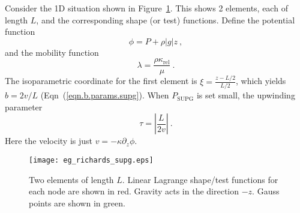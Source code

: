 \documentclass[]{scrreprt}
\begin{document}
Consider the 1D situation shown in Figure~\ref{eg_richards_supg.fig}.
This shows 2 elements, each of length $L$, and the corresponding shape
(or test) functions.  Define the potential function
\begin{equation}
\phi = P + \rho|g|z \ ,
\end{equation}
and the mobility function
\begin{equation}
\lambda = \frac{\rho \kappa_{\mathrm{rel}}}{\mu} \ .
\end{equation}
The isoparametric coordinate for the first element is $\xi =
\frac{z-L/2}{L/2}$, which yields $b=2v/L$
(Eqn~(\ref{eqn.b.params.supg}).  When $P_{\mathrm{SUPG}}$ is set
small, the upwinding parameter
\begin{equation}
\tau = \left|\frac{L}{2v}\right| \ .
\end{equation}
Here the velocity is just $v = -\kappa \partial_{z}\phi$.

\begin{figure}[htb]
\centering
\texttt{[image: eg\_richards\_supg.eps]}
\caption{Two elements of length $L$.  Linear Lagrange shape/test
  functions for each node are shown in red.  Gravity acts in the
  direction $-z$.  Gauss points are shown in green.}
\label{eg_richards_supg.fig}
\end{figure}
\end{document}
